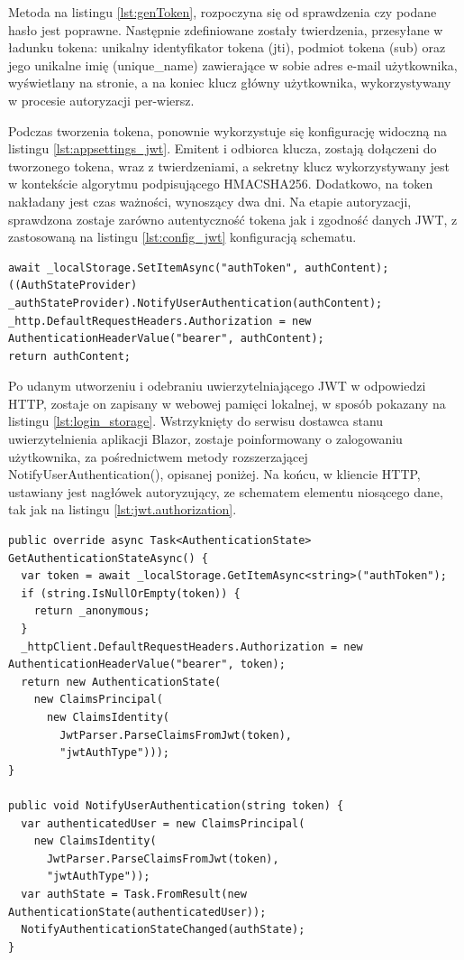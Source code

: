 Metoda na listingu \ref{lst:genToken}, rozpoczyna się od sprawdzenia czy podane hasło jest poprawne. Następnie zdefiniowane zostały twierdzenia, przesyłane w ładunku tokena: unikalny identyfikator tokena (jti), podmiot tokena (sub) oraz jego unikalne imię (unique\_name) zawierające w sobie adres e-mail użytkownika, wyświetlany na stronie, a na koniec klucz główny użytkownika, wykorzystywany w procesie autoryzacji per-wiersz.

Podczas tworzenia tokena, ponownie wykorzystuje się konfigurację widoczną na listingu \ref{lst:appsettings_jwt}. Emitent i odbiorca klucza, zostają dołączeni do tworzonego tokena, wraz z twierdzeniami, a sekretny klucz wykorzystywany jest w kontekście algorytmu podpisującego HMACSHA256. Dodatkowo, na token nakładany jest czas ważności, wynoszący dwa dni. Na etapie autoryzacji, sprawdzona zostaje zarówno autentyczność tokena jak i zgodność danych JWT, z zastosowaną na listingu \ref{lst:config_jwt} konfiguracją schematu.

\begin{lstlisting}[language=CSharp, caption={Fragment metody uwierzytelniającej użytkownika, zapisujący otrzymane dane uwierzytelniające pamięci}, label=lst:login_storage]
await _localStorage.SetItemAsync("authToken", authContent);
((AuthStateProvider) _authStateProvider).NotifyUserAuthentication(authContent);
_http.DefaultRequestHeaders.Authorization = new AuthenticationHeaderValue("bearer", authContent);
return authContent;
\end{lstlisting}

Po udanym utworzeniu i odebraniu uwierzytelniającego JWT w odpowiedzi HTTP, zostaje on zapisany w webowej pamięci lokalnej, w sposób pokazany na listingu \ref{lst:login_storage}. Wstrzyknięty do serwisu dostawca stanu uwierzytelnienia aplikacji Blazor, zostaje poinformowany o zalogowaniu użytkownika, za pośrednictwem metody rozszerzającej NotifyUserAuthentication(), opisanej poniżej. Na końcu, w kliencie HTTP, ustawiany jest nagłówek autoryzujący, ze schematem elementu niosącego dane, tak jak na listingu \ref{lst:jwt.authorization}.

\begin{lstlisting}[language=CSharp, caption={Metody klasy rozszerzającej dostawcę stanu uwierzytelnienia, w aplikacji klienckiej}, label=lst:authStateProvider_login]
public override async Task<AuthenticationState> GetAuthenticationStateAsync() {
  var token = await _localStorage.GetItemAsync<string>("authToken");
  if (string.IsNullOrEmpty(token)) {
    return _anonymous;
  }
  _httpClient.DefaultRequestHeaders.Authorization = new AuthenticationHeaderValue("bearer", token);
  return new AuthenticationState(
    new ClaimsPrincipal(
      new ClaimsIdentity(
        JwtParser.ParseClaimsFromJwt(token),
        "jwtAuthType")));
}

public void NotifyUserAuthentication(string token) {
  var authenticatedUser = new ClaimsPrincipal(
    new ClaimsIdentity(
      JwtParser.ParseClaimsFromJwt(token),
      "jwtAuthType"));
  var authState = Task.FromResult(new AuthenticationState(authenticatedUser));
  NotifyAuthenticationStateChanged(authState);
}
\end{lstlisting}

